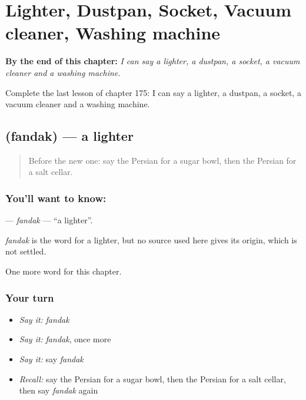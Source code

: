 
\chapter{Lighter, Dustpan, Socket, Vacuum cleaner, Washing machine}
\label{ch:fa-lighter-dustpan-socket-vacuum-cleaner-washing-machine}

\begin{chapteropening}
\textbf{By the end of this chapter:} \emph{I can say a lighter, a dustpan, a socket, a vacuum cleaner and a washing machine.}

Complete the last lesson of chapter 175: I can say a lighter, a dustpan, a socket, a vacuum cleaner and a washing machine.
\end{chapteropening}

\section[\texorpdfstring{\fa{فندک} (fandak)}{فندک (fandak)}]{ (fandak) — a lighter}

\label{lesson:FA-C175-fandak}



\begin{quote}
Before the new one: say the Persian for a sugar bowl, then the Persian for a salt cellar.
\end{quote}

\subsection*{You'll want to know: }
\textbf{} — \emph{fandak} — \textquotedblleft{}a lighter\textquotedblright{}.

\begin{cousinweb}
\emph{fandak} is the word for a lighter, but no source used here gives its origin, which is not settled.
\end{cousinweb}

\begin{grammarlens}[title={What you've built}]
One more word for this chapter.
\end{grammarlens}

\subsection*{Your turn}
\begin{itemize}
\raggedright
  \item \emph{Say it:} \emph{fandak}
  \item \emph{Say it:} \emph{fandak}, once more
  \item \emph{Say it:} say \emph{fandak}
  \item \emph{Recall:} say the Persian for a sugar bowl, then the Persian for a salt cellar, then say \emph{fandak} again
\end{itemize}

